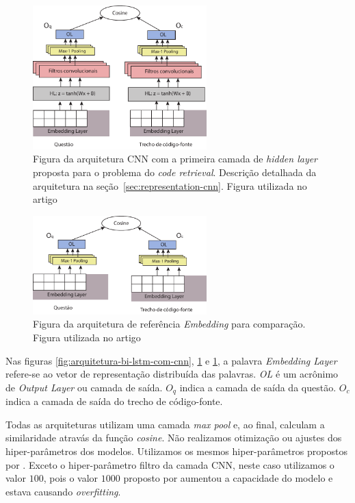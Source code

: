 \begin{figure}[h]
    \centering
    \includegraphics[width=0.6\textwidth]{figuras/cap-resultados-preliminares/ArquiteturaCNN.pdf}
    \caption{Figura da arquitetura CNN com a primeira camada de \textit{hidden layer} proposta para o problema do \textit{code retrieval}. Descrição detalhada da arquitetura na seção~\ref{sec:representation-cnn}. Figura utilizada no artigo \cite{marcelo-vem-2019}}
    \label{fig:arquitetura-cnn}
\end{figure}

\begin{figure}[h]
    \centering
    \includegraphics[width=0.6\textwidth]{figuras/cap-resultados-preliminares/ArquiteturaEmbedding.pdf}
    \caption{Figura da arquitetura de referência \textit{Embedding} para comparação. Figura utilizada no artigo \cite{marcelo-vem-2019}}
    \label{fig:arquitetura-embedding}
\end{figure}
Nas figuras \ref{fig:arquitetura-bi-lstm-com-cnn}, \ref{fig:arquitetura-cnn} e \ref{fig:arquitetura-cnn}, a palavra \textit{Embedding Layer} refere-se ao vetor de representação distribuída das palavras. \emph{OL} é um acrônimo de \textit{Output Layer} ou camada de saída. $O_{q}$ indica a camada de saída da questão. $O_{c}$ indica a camada de saída do trecho de código-fonte.

Todas as arquiteturas utilizam uma camada \textit{max pool} e, ao final, calculam a similaridade atravás da função \textit{cosine}.
Não realizamos otimização ou ajustes dos hiper-parâmetros dos modelos. Utilizamos os mesmos hiper-parâmetros propostos por \cite{tan-lstm-qa}. Exceto o hiper-parâmetro filtro da camada CNN, neste caso utilizamos o valor $100$, pois o valor $1000$ proposto por \cite{tan-lstm-qa} aumentou a capacidade do modelo e estava causando \textit{overfitting}.

